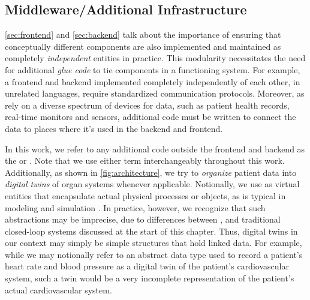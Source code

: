 \subsection{Middleware/Additional Infrastructure}\label{sec:middleware}

\autoref{sec:frontend} and \autoref{sec:backend} talk about
the importance of ensuring that conceptually different components are
also implemented and maintained as completely \emph{independent} entities
in practice. This modularity necessitates the need for additional
\emph{glue code} to tie components in a functioning system. For example,
a frontend and backend implemented completely independently of each
other, in unrelated languages, require standardized communication
protocols. Moreover, as \CDSSs{} rely on a diverse spectrum of devices for
data, such as patient health records, real-time monitors and sensors, additional
code must be written to connect the data to places where it's used in
the backend and frontend.

In this work, we refer to any additional code outside the frontend and
backend as the  or .
Note that we use either term interchangeably throughout this work.
Additionally, as shown in \autoref{fig:architecture},
we try to \emph{organize} patient
data into \emph{digital twins} of organ systems whenever applicable.
Notionally, we use  as virtual entities that encapsulate
actual physical processes or objects,
as is typical in modeling and simulation \cite{TaoJMS22}.
In practice, however, we recognize that such abstractions may be
imprecise, due to differences between \CDSSs{}, and traditional
closed-loop systems discussed at the start of this chapter. Thus,
digital twins in our context may simply be simple structures that
hold linked data. For example, while we may notionally refer to an abstract data type
used to record a patient's heart rate and blood pressure as a digital twin of
the patient's cardiovascular system, such a twin would be a very incomplete
representation of the patient's actual cardiovascular system.


